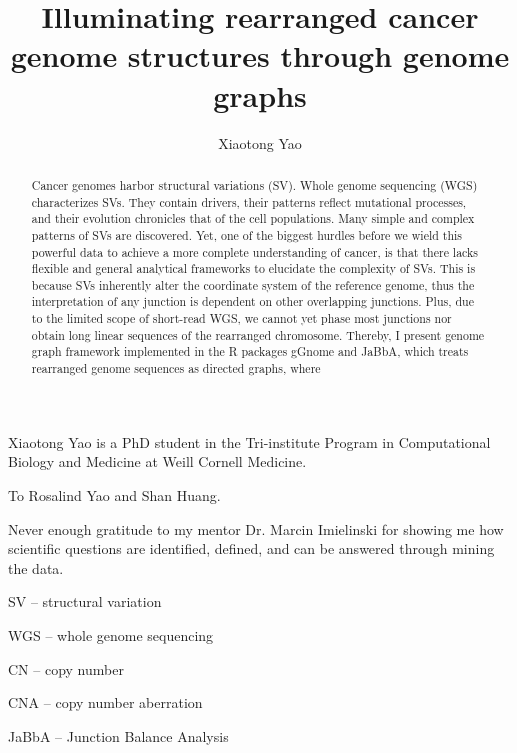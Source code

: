 \documentclass[phd,tocprelim]{cornell}
\title{Illuminating rearranged cancer genome structures through genome graphs}
\author {Xiaotong Yao}
\begin{document}
\maketitle
\makecopyright

\begin{abstract}
Cancer genomes harbor structural variations (SV). Whole genome sequencing (WGS) characterizes SVs. They contain drivers, their patterns reflect mutational processes, and their evolution chronicles that of the cell populations. Many simple and complex patterns of SVs are discovered. Yet, one of the biggest hurdles before we wield this powerful data to achieve a more complete understanding of cancer, is that there lacks flexible and general analytical frameworks to elucidate the complexity of SVs. This is because SVs inherently alter the coordinate system of the reference genome, thus the interpretation of any junction is dependent on other overlapping junctions. Plus, due to the limited scope of short-read WGS, we cannot yet phase most junctions nor obtain long linear sequences of the rearranged chromosome. Thereby, I present genome graph framework implemented in the R packages gGnome and JaBbA, which treats rearranged genome sequences as directed graphs, where 
\end{abstract}

\begin{biosketch}
Xiaotong Yao is a PhD student in the Tri-institute Program in Computational Biology and Medicine at Weill Cornell Medicine.
\end{biosketch}

\begin{dedication}
To Rosalind Yao and Shan Huang.
\end{dedication}

\begin{acknowledgements}
Never enough gratitude to my mentor Dr. Marcin Imielinski for showing me how scientific questions are identified, defined, and can be answered through mining the data.
\end{acknowledgements}



\contentspage
\tablelistpage
\figurelistpage
\abbrlist

SV -- structural variation

WGS -- whole genome sequencing

CN -- copy number

CNA -- copy number aberration

JaBbA -- Junction Balance Analysis
\end{document}
